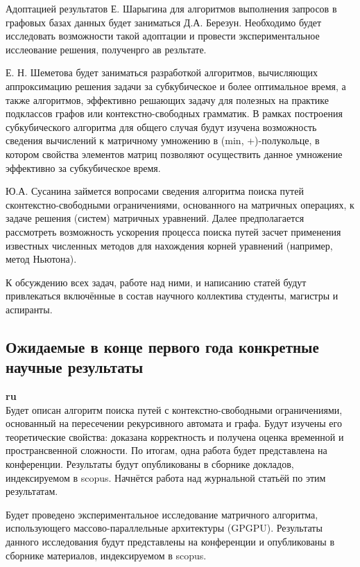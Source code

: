 \documentclass[12pt]{article}  %
\theoremstyle{remark}
\begin{document}
Адоптацией результатов Е. Шарыгина для алгоритмов выполнения запросов в графовых базах данных будет заниматься Д.А. Березун.
Необходимо будет исследовать возможности такой адоптации и провести экспериментальное исслеование решения, полученрго ав резльтате.

Е. Н. Шеметова будет заниматься разработкой алгоритмов, вычисляющих аппроксимацию решения задачи за субкубическое и более оптимальное время, а также алгоритмов, эффективно решающих задачу для полезных на практике подклассов графов или контекстно-свободных грамматик. В рамках построения субкубического алгоритма для общего случая будут изучена возможность сведения вычислений к матричному умножению в (min, +)-полукольце, в котором свойства элементов матриц позволяют осуществить данное умножение эффективно за субкубическое время.

Ю.А. Сусанина займется вопросами сведения алгоритма поиска путей сконтекстно-свободными ограничениями, основанного на матричных операциях, к задаче решения (систем) матричных уравнений.
Далее предполагается рассмотреть возможность ускорения процесса поиска путей засчет применения известных численных методов для нахождения корней уравнений (например, метод Ньютона).

К обсуждению всех задач, работе над ними, и написанию статей будут привлекаться включённые в состав научного коллектива студенты, магистры и аспиранты.

\subsection{Ожидаемые в конце первого года конкретные научные результаты}

\textbf{ru}\\
%
Будет описан алгоритм поиска путей с контекстно-свободными ограничениями, основанный на пересечении рекурсивного автомата и графа. Будут изучены его теоретические свойства: доказана корректность и получена оценка временной и пространсвенной сложности.
По итогам, одна работа будет представлена на конференции. Результаты будут опубликованы в сборнике докладов, индексируемом в scopus.
Начнётся работа над журнальной статьёй по этим результатам.

Будет проведено экспериментальное исследование матричного алгоритма, использующего массово-параллельные архитектуры (GPGPU).
Результаты данного исследования будут представлены на конференции и опубликованы в сборнике материалов, индексируемом в scopus.
\end{document}
